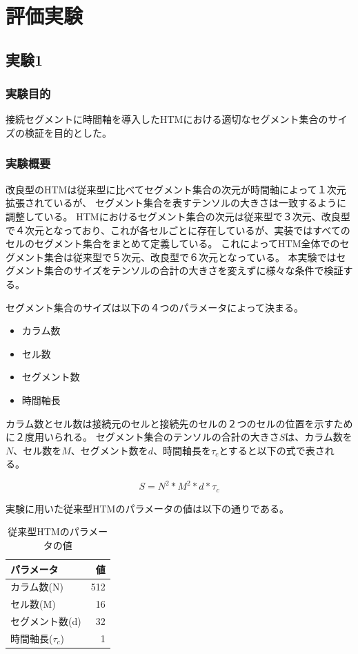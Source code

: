 \chapter{評価実験}

\section{実験1}
\subsection{実験目的}
接続セグメントに時間軸を導入したHTMにおける適切なセグメント集合のサイズの検証を目的とした。

\subsection{実験概要}
改良型のHTMは従来型に比べてセグメント集合の次元が時間軸によって１次元拡張されているが、
セグメント集合を表すテンソルの大きさは一致するように調整している。
HTMにおけるセグメント集合の次元は従来型で３次元、改良型で４次元となっており、これが各セルごとに存在しているが、実装ではすべてのセルのセグメント集合をまとめて定義している。
これによってHTM全体でのセグメント集合は従来型で５次元、改良型で６次元となっている。
本実験ではセグメント集合のサイズをテンソルの合計の大きさを変えずに様々な条件で検証する。

セグメント集合のサイズは以下の４つのパラメータによって決まる。
\begin{itemize}
  \item カラム数
  \item セル数
  \item セグメント数
  \item 時間軸長
\end{itemize}

カラム数とセル数は接続元のセルと接続先のセルの２つのセルの位置を示すために２度用いられる。
セグメント集合のテンソルの合計の大きさ$S$は、カラム数を$N$、セル数を$M$、セグメント数を$d$、時間軸長を$\tau_c$とすると以下の式で表される。

\begin{equation}
  S = N^2 * M^2 * d * \tau_c
\end{equation}

実験に用いた従来型HTMのパラメータの値は以下の通りである。
\begin{table}[hbtp]
  \caption{従来型HTMのパラメータの値}
  \label{old_htm_parameter}
  \centering
  \begin{tabular}{lr}
    \hline
    パラメータ & 値 \\
    \hline \hline
    カラム数(N) & 512 \\
    セル数(M) & 16 \\
    セグメント数(d) & 32 \\
    時間軸長($\tau_c$) & 1 \\
    \hline
  \end{tabular}
\end{table}

